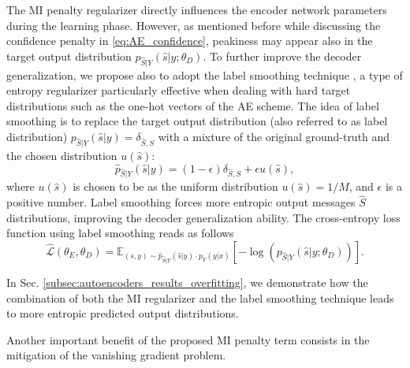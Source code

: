 The MI penalty regularizer directly influences the encoder network parameters during the learning phase. However, as mentioned before while discussing the confidence penalty in \eqref{eq:AE_confidence}, peakiness may appear also in the target output distribution $p_{\hat{S}|Y}(\hat{s}|y;\theta_D)$. To further improve the decoder generalization, we propose also to adopt the label smoothing technique \cite{Szegedy2015b}, a type of entropy regularizer particularly effective when dealing with hard target distributions such as the one-hot vectors of the AE scheme. The idea of label smoothing is to replace the target output distribution (also referred to as label distribution) $p_{\hat{S}|Y}(\hat{s}|y)=\delta_{\hat{S},S}$ with a mixture of the original ground-truth and the chosen distribution $u(\hat{s})$:
\begin{equation}
\hat{p}_{\hat{S}|Y}(\hat{s}|y)=(1-\epsilon)\delta_{\hat{S},S}+\epsilon u(\hat{s}),
\end{equation}
where $u(\hat{s})$ is chosen to be as the uniform distribution $u(\hat{s}) = 1/M$, and $\epsilon$ is a positive number. Label smoothing forces more entropic output messages $\hat{S}$ distributions, improving the decoder generalization ability. The cross-entropy loss function using label smoothing reads as follows
\begin{equation}
\hat{\mathcal{L}}(\theta_E, \theta_D) = \mathbb{E}_{(s,y)\sim \hat{p}_{\hat{S}|Y}(\hat{s}|y)\cdot p_{Y}(y|x)}[-\log(p_{\hat{S}|Y}(\hat{s}|y;\theta_D))].
\end{equation}

In Sec. \ref{subsec:autoencoders_results_overfitting}, we demonstrate how the combination of both the MI regularizer and the label smoothing technique leads to more entropic predicted output distributions.  

Another important benefit of the proposed MI penalty term consists in the mitigation of the vanishing gradient problem.

